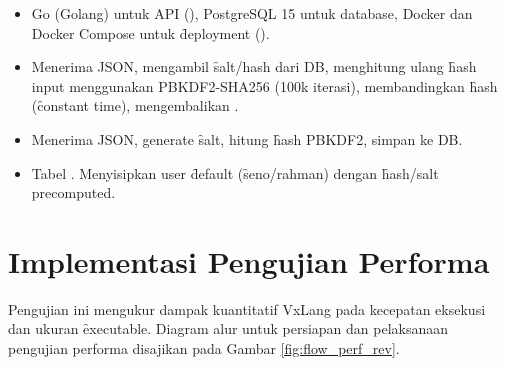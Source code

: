\begin{itemize}
	\item {} Go (Golang) untuk API (), PostgreSQL 15 untuk database, Docker dan Docker Compose untuk \f{deployment} ().
	\item {} Menerima JSON, mengambil \f{salt/hash} dari DB, menghitung ulang \f{hash} input menggunakan PBKDF2-SHA256 (100k iterasi), membandingkan \f{hash} (\f{constant time}), mengembalikan .
	\item {} Menerima JSON, generate \f{salt}, hitung \f{hash} PBKDF2, simpan ke DB.
	\item {} Tabel . Menyisipkan user \f{default} (\f{seno}/rahman) dengan \f{hash/salt} precomputed.
\end{itemize}

\section{Implementasi Pengujian Performa}
Pengujian ini mengukur dampak kuantitatif VxLang pada kecepatan eksekusi dan ukuran \f{executable}. Diagram alur untuk persiapan dan pelaksanaan pengujian performa disajikan pada Gambar \ref{fig:flow_perf_rev}.


